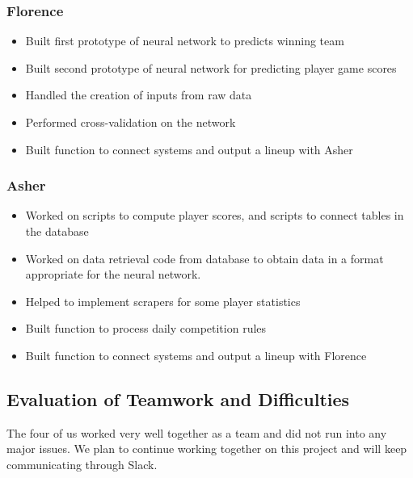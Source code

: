 \subsubsection{Florence}
\begin{itemize}
  \item Built first prototype of neural network to predicts winning team
  \item Built second prototype of neural network for predicting player game scores
  \item Handled the creation of inputs from raw data
  \item Performed cross-validation on the network
  \item Built function to connect systems and output a lineup with Asher
\end{itemize}
\subsubsection{Asher}
\begin{itemize}
  \item Worked on scripts to compute player scores, and scripts to connect tables in the database
  \item Worked on data retrieval code from database to obtain data in a format appropriate for the neural network.
  \item Helped to implement scrapers for some player statistics
  \item Built function to process daily competition rules
  \item Built function to connect systems and output a lineup with Florence
\end{itemize}

\subsection{Evaluation of Teamwork and Difficulties}
The four of us worked very well together as a team and did not run into any major issues. We plan to continue working together on this project and will keep communicating through Slack.